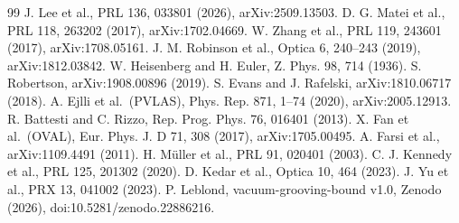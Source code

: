 \documentclass[11pt, a4paper]{article}
\begin{document}
\begin{thebibliography}{99}
 J. Lee et al., PRL 136, 033801 (2026), arXiv:2509.13503.
 D. G. Matei et al., PRL 118, 263202 (2017), arXiv:1702.04669.
 W. Zhang et al., PRL 119, 243601 (2017), arXiv:1708.05161.
 J. M. Robinson et al., Optica 6, 240--243 (2019), arXiv:1812.03842.
 W. Heisenberg and H. Euler, Z. Phys. 98, 714 (1936).
 S. Robertson, arXiv:1908.00896 (2019).
 S. Evans and J. Rafelski, arXiv:1810.06717 (2018).
 A. Ejlli et al.\ (PVLAS), Phys. Rep. 871, 1--74 (2020), arXiv:2005.12913.
 R. Battesti and C. Rizzo, Rep. Prog. Phys. 76, 016401 (2013).
 X. Fan et al.\ (OVAL), Eur. Phys. J. D 71, 308 (2017), arXiv:1705.00495.
 A. Farsi et al., arXiv:1109.4491 (2011).
 H. M\"uller et al., PRL 91, 020401 (2003).
 C. J. Kennedy et al., PRL 125, 201302 (2020).
 D. Kedar et al., Optica 10, 464 (2023).
 J. Yu et al., PRX 13, 041002 (2023).
 P. Leblond, vacuum-grooving-bound v1.0, Zenodo (2026), doi:10.5281/zenodo.22886216.
\end{thebibliography}
\end{document}
